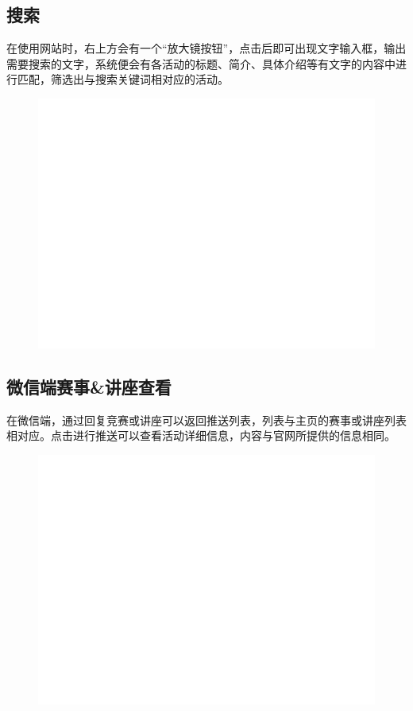 \documentclass[UTF8]{ctexart}
\begin{document}
\newpage
\subsection{搜索}

在使用网站时，右上方会有一个“放大镜按钮”，点击后即可出现文字输入框，输出需要搜索的文字，系统便会有各活动的标题、简介、具体介绍等有文字的内容中进行匹配，筛选出与搜索关键词相对应的活动。

\begin{figure}[h]
    \centering
    \includegraphics[width=\textwidth]{manual_images//temp.png}
\end{figure}

\newpage
\subsection{微信端赛事\&讲座查看}

在微信端，通过回复竞赛或讲座可以返回推送列表，列表与主页的赛事或讲座列表相对应。点击进行推送可以查看活动详细信息，内容与官网所提供的信息相同。

\begin{figure}[h]
    \centering
    \includegraphics[width=\textwidth]{manual_images//temp.png}
\end{figure}
\end{document}
